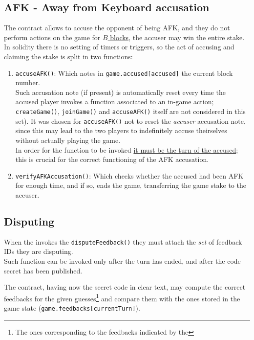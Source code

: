 \subsection{AFK - Away from Keyboard accusation}

The contract allows to accuse the opponent of being AFK, and they do not perform actions on the game for \ul{$B$ blocks}, the accuser may win the entire stake.\\
In solidity there is no setting of timers or triggers, so the act of accusing and claiming the stake is split in two functions:
\begin{enumerate}
    \item \texttt{accuseAFK()}: Which notes in \texttt{game.accused[accused]} the current block number.\\
    Such accusation note (if present) is automatically reset every time the accused player invokes a function associated to an in-game action; \texttt{createGame()}, \texttt{joinGame()} and \texttt{accuseAFK()} itself are not considered in this set).
    It was chosen for \texttt{accuseAFK()} not to reset the \textit{accuser} accusation note, since this may lead to the two players to indefinitely accuse theirselves without actually playing the game.\\
    In order for the function to be invoked \ul{it must be the turn of the accused};
    this is crucial for the correct functioning of the AFK accusation.
    \item \texttt{verifyAFKAccusation()}: Which checks whether the accused had been AFK for enough time, and if so, ends the game, transferring the game stake to the accuser.
\end{enumerate}

\subsection{Disputing}
When the  invokes the \lstinline{disputeFeedback()} they must attach the \textit{set} of feedback IDs they are disputing.\\
Such function can be invoked only after the turn has ended, and after the code secret has been published.

The contract, having now the secret code in clear text, may compute the correct feedbacks for the given guesses\footnote{The ones corresponding to the feedbacks indicated by the } and compare them with the ones stored in the game state (\texttt{game.feedbacks[currentTurn]}).

